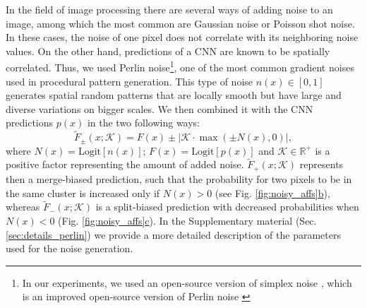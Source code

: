 In the field of image processing there are several ways of adding noise to an image, among which the most common are Gaussian noise or Poisson shot noise. 
In these cases, the noise of one pixel does not correlate with its neighboring noise values. On the other hand, predictions of a CNN are known to be spatially correlated. 
Thus, we used Perlin noise\footnote{In our experiments, we used an open-source version of simplex noise \cite{perlin2001noise}, which is an improved open-source version of Perlin noise \cite{perlin1985image}}, one of the most common gradient noises used in procedural pattern generation. This type of noise $n(x)\in[0,1]$ generates spatial random patterns that are locally smooth but have large and diverse variations on bigger scales. We then combined it with the CNN predictions $p(x)$ in the two following ways: 
\begin{equation}\label{eq:noise_biased_predictions}
\tilde{F}_{\pm}(x;\mathcal{K})=F(x)\pm\big|\mathcal{K}\cdot\max\left(\pm N(x),0\right)\big|,
\end{equation}
where  $N(x)=\mathrm{Logit}[n(x)]$; $F(x)=\mathrm{Logit}[p(x)]$ and $\mathcal{K}\in \mathbb{R}^+$ is a positive factor representing the amount of added noise. $\tilde{F}_{+}(x;\mathcal{K})$ represents then a merge-biased prediction, such that the probability for two pixels to be in the same cluster is increased only if $N(x)>0$ (see Fig. \hyperref[fig:noisy_affs]{\ref*{fig:noisy_affs}b}), whereas $\tilde{F}_{-}(x;\mathcal{K})$ is a split-biased prediction with decreased probabilities when $N(x)<0$ (Fig. \hyperref[fig:noisy_affs]{\ref*{fig:noisy_affs}c}). In the Supplementary material (Sec. \ref{sec:details_perlin}) we provide a more detailed description of the parameters used for the noise generation.

